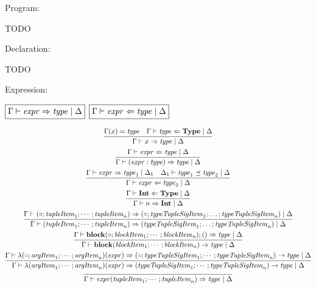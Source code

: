 Program:

TODO

Declaration:

TODO

Expression:

$\fbox{$\Gamma \vdash \mathit{expr} \Rightarrow \mathit{type} \mid \Delta$}$
$\fbox{$\Gamma \vdash \mathit{expr} \Leftarrow \mathit{type} \mid \Delta$}$

\begin{gather*}
  \infer{\Gamma \vdash x \Rightarrow \mathit{type} \mid \Delta}{
    \Gamma(x) = \mathit{type}
    &
    \Gamma \vdash \mathit{type} \Leftarrow \mathbf{Type} \mid \Delta
  }
  \\
  \infer{\Gamma \vdash (\mathit{expr}: \mathit{type}) \Rightarrow \mathit{type} \mid \Delta}{
    \Gamma \vdash \mathit{expr} \Leftarrow \mathit{type} \mid \Delta
  }
  \\
  \infer{\Gamma \vdash \mathit{expr} \Leftarrow \mathit{type}_2 \mid \Delta}{
    \Gamma \vdash \mathit{expr} \Rightarrow \mathit{type}_1 \mid \Delta_1
    &
    \Delta_1 \vdash \mathit{type}_1 \preceq \mathit{type}_2 \mid \Delta
  }
  \\
  \infer{\Gamma \vdash n \Rightarrow \mathbf{Int} \mid \Delta}{
    \Gamma \vdash \mathbf{Int} \Leftarrow \mathbf{Type} \mid \Delta
  }
  \\
  \infer{\Gamma \vdash (\mathit{tupleItem}_1; \cdots; \mathit{tupleItem}_n) \Rightarrow (\mathit{typeTupleSigItem}_1; \ldots; \mathit{typeTupleSigItem}_n) \mid \Delta}{
    \Gamma \vdash (\circ; \mathit{tupleItem}_1; \cdots; \mathit{tupleItem}_n) \Rightarrow (\circ; \mathit{typeTupleSigItem}_1; \ldots; \mathit{typeTupleSigItem}_n) \mid \Delta
  }
  \\
  \infer{\Gamma \vdash \mathbf{block}(\mathit{blockItem}_1; \cdots; \mathit{blockItem}_n) \Rightarrow \mathit{type} \mid \Delta}{
    \Gamma \vdash \mathbf{block}(\circ; \mathit{blockItem}_1; \cdots; \mathit{blockItem}_n); () \Rightarrow \mathit{type} \mid \Delta
  }
  \\
  \infer{\Gamma \vdash \lambda(\mathit{argItem}_1; \cdots; \mathit{argItem}_n)(\mathit{expr}) \Rightarrow (\mathit{typeTupleSigItem}_1; \cdots; \mathit{typeTupleSigItem}_n) \rightarrow \mathit{type} \mid \Delta}{
    \Gamma \vdash \lambda(\circ; \mathit{argItem}_1; \cdots; \mathit{argItem}_n)(\mathit{expr}) \Rightarrow (\circ; \mathit{typeTupleSigItem}_1; \cdots; \mathit{typeTupleSigItem}_n) \rightarrow \mathit{type} \mid \Delta
  }
  \\
  \infer{\Gamma \vdash \mathit{expr}(\mathit{tupleItem}_1; \cdots; \mathit{tupleItem}_n) \Rightarrow \mathit{type} \mid \Delta}{
}
\end{gather*}
